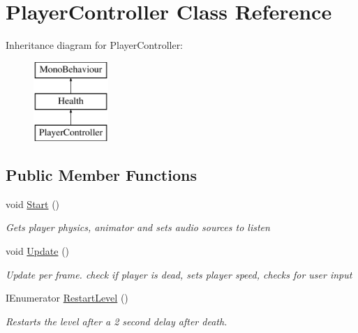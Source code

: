 \hypertarget{classPlayerController}{\section{Player\-Controller Class Reference}
\label{classPlayerController}
}
Inheritance diagram for Player\-Controller\-:\begin{figure}[H]
\begin{center}
\leavevmode
\includegraphics[height=3.000000cm]{classPlayerController}
\end{center}
\end{figure}
\subsection*{Public Member Functions}
\begin{DoxyCompactItemize}
\item 
void \hyperlink{classPlayerController_ae1117d9c4da3193181cddad2c814e467}{Start} ()
\begin{DoxyCompactList}\small\item\em Gets player physics, animator and sets audio sources to listen \end{DoxyCompactList}\item 
void \hyperlink{classPlayerController_ae8bc83dffb99867a04be016473ed2c43}{Update} ()
\begin{DoxyCompactList}\small\item\em Update per frame. check if player is dead, sets player speed, checks for user input \end{DoxyCompactList}\item 
I\-Enumerator \hyperlink{classPlayerController_a5e040cf8e9c19fc2946d979ffbd204b7}{Restart\-Level} ()
\begin{DoxyCompactList}\small\item\em Restarts the level after a 2 second delay after death. \end{DoxyCompactList}\end{DoxyCompactItemize}
